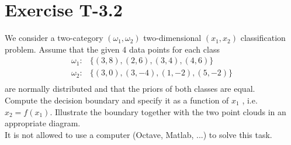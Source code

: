 \section*{Exercise T-3.2}

We consider a two-category $(\omega_1 , \omega_2 )$ two-dimensional $(x_1, x_2 )$ classification problem. Assume that the given 4 data points for each class
\begin{align}
\omega_1 :& \{(3,8),(2,6),(3,4),(4,6)\}\nonumber\\ 
\omega_2 :& \{(3,0),(3,-4),(1,-2),(5,-2)\}\nonumber\\ \nonumber
\end{align}
are normally distributed and that the priors of both classes are equal.\\

Compute the decision boundary and specify it as a function of $x_1$ , i.e. $x_2 = f (x_1 )$. Illustrate the boundary together with the two point clouds in an appropriate diagram.\\

It is not allowed to use a computer (Octave, Matlab, ...) to solve this task.


